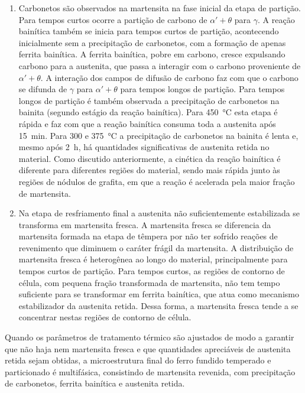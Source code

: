 \begin{enumerate}
  \item Carbonetos são observados na martensita na fase inicial da etapa de partição. Para tempos curtos ocorre a partição de carbono de $\alpha' + \theta$ para $\gamma$. A reação bainítica também se inicia para tempos curtos de partição, acontecendo inicialmente sem a precipitação de carbonetos, com a formação de apenas ferrita bainítica. A ferrita bainítica, pobre em carbono, cresce expulsando carbono para a austenita, que passa a interagir com o carbono proveniente de $\alpha' + \theta$. A interação dos campos de difusão de carbono faz com que o carbono se difunda de $\gamma$ para $\alpha' + \theta$ para tempos longos de partição. Para tempos longos de partição é também observada a precipitação de carbonetos na bainita (segundo estágio da reação bainítica). Para \SI{450}{\degreeCelsius} esta etapa é rápida e faz com que a reação bainítica consuma toda a austenita após 15~min. Para 300 e \SI{375}{\degreeCelsius} a precipitação de carbonetos na bainita é lenta e, mesmo após 2~h, há quantidades significativas de austenita retida no material. Como discutido anteriormente, a cinética da reação bainítica é diferente para diferentes regiões do material, sendo mais rápida junto às regiões de nódulos de grafita, em que a reação é acelerada pela maior fração de martensita.

  \item Na etapa de resfriamento final a austenita não suficientemente estabilizada se transforma em martensita fresca. A martensita fresca se diferencia da martensita formada na etapa de têmpera por não ter sofrido reações de revenimento que diminuem o caráter frágil da martensita. A distribuição de martensita fresca é heterogênea ao longo do material, principalmente para tempos curtos de partição. Para tempos curtos, as regiões de contorno de célula, com pequena fração transformada de martensita, não tem tempo suficiente para se transformar em ferrita bainítica, que atua como mecanismo estabilizador da austenita retida. Dessa forma, a martensita fresca tende a se concentrar nestas regiões de contorno de célula.
\end{enumerate}

Quando os parâmetros de tratamento térmico são ajustados de modo a garantir que não haja nem martensita fresca e que quantidades apreciáveis de austenita retida sejam obtidas, a microestrutura final do ferro fundido temperado e particionado é multifásica, consistindo de martensita revenida, com precipitação de carbonetos, ferrita bainítica e austenita retida.

